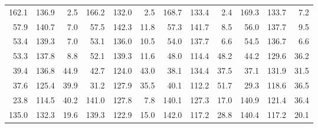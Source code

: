 \documentclass[draft]{article}
\begin{document}
\begin{center}
\begin{tabular}{rrrrrrrrrrrr}
162.1&136.9&  2.5&166.2&132.0&  2.5&168.7&133.4&  2.4&169.3&133.7&  7.2\\
 57.9&140.7&  7.0& 57.5&142.3& 11.8& 57.3&141.7&  8.5& 56.0&137.7&  9.5\\
 53.4&139.3&  7.0& 53.1&136.0& 10.5& 54.0&137.7&  6.6& 54.5&136.7&  6.6\\
 53.3&137.8&  8.8& 52.1&139.3& 11.6& 48.0&114.4& 48.2& 44.2&129.6& 36.2\\
 39.4&136.8& 44.9& 42.7&124.0& 43.0& 38.1&134.4& 37.5& 37.1&131.9& 31.5\\
 37.6&125.4& 39.9& 31.2&127.9& 35.5& 40.1&112.2& 51.7& 29.3&118.6& 36.5\\
 23.8&114.5& 40.2&141.0&127.8&  7.8&140.1&127.3& 17.0&140.9&121.4& 36.4\\
135.0&132.3& 19.6&139.3&122.9& 15.0&142.0&117.2& 28.8&140.4&117.2& 20.1\\
\hline
\end{tabular}
\end{center}
\clearpage
\end{document}
